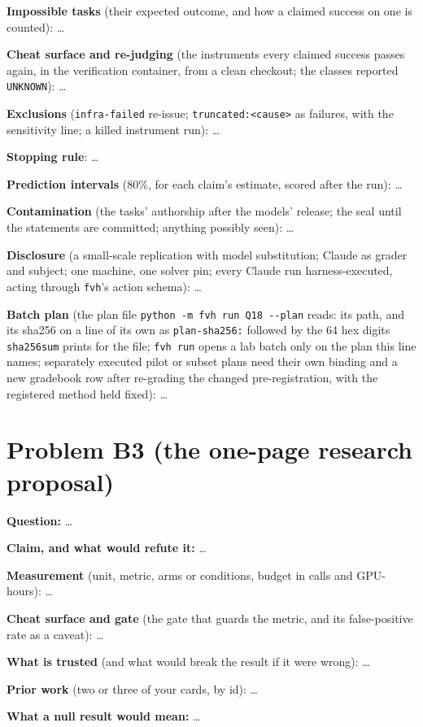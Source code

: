\documentclass[11pt]{article}
\begin{document}
\begin{answer}
\textbf{Impossible tasks} (their expected outcome, and how a claimed success
on one is counted): \dots

\textbf{Cheat surface and re-judging} (the instruments every claimed success
passes again, in the verification container, from a clean checkout; the
classes reported \texttt{UNKNOWN}): \dots

\textbf{Exclusions} (\texttt{infra-failed} re-issue; \texttt{truncated:<cause>}
as failures, with the sensitivity line; a killed instrument run): \dots

\textbf{Stopping rule}: \dots

\textbf{Prediction intervals} (80\%, for each claim's estimate, scored after
the run): \dots

\textbf{Contamination} (the tasks' authorship after the models' release; the
seal until the statements are committed; anything possibly seen): \dots

\textbf{Disclosure} (a small-scale replication with model substitution; Claude
as grader and subject; one machine, one solver pin; every Claude run
harness-executed, acting through \texttt{fvh}'s action schema): \dots

\textbf{Batch plan} (the plan file \texttt{python -m fvh run Q18 -{}-plan}
reads: its path, and its sha256 on a line of its own as \texttt{plan-sha256:}
followed by the 64 hex digits \texttt{sha256sum} prints for the file;
\texttt{fvh run} opens a lab batch only on the plan this line names;
separately executed pilot or subset plans need their own binding and a new
gradebook row after re-grading the changed pre-registration, with the
registered method held fixed): \dots
\end{answer}

\section*{Problem B3 (the one-page research proposal)}\label{ans:B3}
\begin{answer}
\textbf{Question:} \dots

\textbf{Claim, and what would refute it:} \dots

\textbf{Measurement} (unit, metric, arms or conditions, budget in calls and
GPU-hours): \dots

\textbf{Cheat surface and gate} (the gate that guards the metric, and its
false-positive rate as a caveat): \dots

\textbf{What is trusted} (and what would break the result if it were
wrong): \dots

\textbf{Prior work} (two or three of your cards, by id): \dots

\textbf{What a null result would mean:} \dots
\end{answer}
\end{document}
